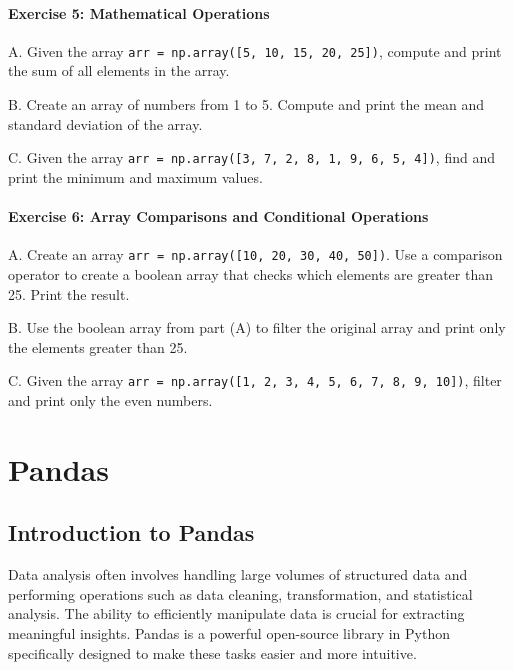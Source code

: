 \documentclass[
  letterpaper,
  DIV=11,
  numbers=noendperiod]{scrreprt}
\begin{document}
\hypertarget{exercise-5-mathematical-operations}{%
\subsubsection{Exercise 5: Mathematical
Operations}\label{exercise-5-mathematical-operations}}

A. Given the array
\texttt{arr\ =\ np.array({[}5,\ 10,\ 15,\ 20,\ 25{]})}, compute and
print the sum of all elements in the array.

B. Create an array of numbers from 1 to 5. Compute and print the mean
and standard deviation of the array.

C. Given the array
\texttt{arr\ =\ np.array({[}3,\ 7,\ 2,\ 8,\ 1,\ 9,\ 6,\ 5,\ 4{]})}, find
and print the minimum and maximum values.

\hypertarget{exercise-6-array-comparisons-and-conditional-operations}{%
\subsubsection{Exercise 6: Array Comparisons and Conditional
Operations}\label{exercise-6-array-comparisons-and-conditional-operations}}

A. Create an array
\texttt{arr\ =\ np.array({[}10,\ 20,\ 30,\ 40,\ 50{]})}. Use a
comparison operator to create a boolean array that checks which elements
are greater than 25. Print the result.

B. Use the boolean array from part (A) to filter the original array and
print only the elements greater than 25.

C. Given the array
\texttt{arr\ =\ np.array({[}1,\ 2,\ 3,\ 4,\ 5,\ 6,\ 7,\ 8,\ 9,\ 10{]})},
filter and print only the even numbers.


\hypertarget{sec-pandas}{%
\chapter{Pandas}\label{sec-pandas}}

\hypertarget{introduction-to-pandas}{%
\section{Introduction to Pandas}\label{introduction-to-pandas}}

Data analysis often involves handling large volumes of structured data
and performing operations such as data cleaning, transformation, and
statistical analysis. The ability to efficiently manipulate data is
crucial for extracting meaningful insights. Pandas is a powerful
open-source library in Python specifically designed to make these tasks
easier and more intuitive.
\end{document}
